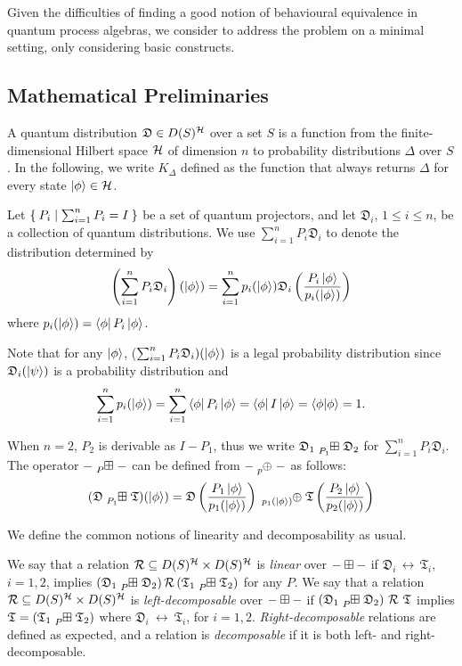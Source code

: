 \newcommand{\quantumdst}{\mathfrak{D}}
\newcommand{\quantumdsta}{\mathfrak{T}}

Given the difficulties of finding a good notion of behavioural equivalence in quantum process algebras, we consider to address the problem on a minimal setting, only considering basic constructs.

\subsection{Mathematical Preliminaries}

A quantum distribution $\quantumdst \in D(S)^\hilbert$ over a set $S$ is a function from the finite-dimensional Hilbert space $\mathcal{H}$ of dimension $n$ to probability distributions $\Delta$ over $S$.
In the following, we write $K_{\Delta}$ defined as the function that always returns $\Delta$ for every state $\ket{\phi} \in \mathcal{H}$.

Let $\Set{P_i | \sum_{i = 1}^{n} P_i = I }$ be a set of quantum projectors, and let $\quantumdst_i$, $1 \leq i \leq n$, be a collection of quantum distributions.
We use $\sum_{i = 1}^{n} P_i \quantumdst_i$ to denote the distribution determined by 
\[
\left(\sum_{i = 1}^{n} P_i \quantumdst_i\right) (\ket{\phi}) = \sum_{i = 1}^{n} p_i(\ket{\phi}) \quantumdst_i \left(\frac{P_i \ket{\phi}}{p_i(\ket{\phi})}\right)
\]
where $p_i(\ket{\phi}) = \bra{\phi} P_i \ket{\phi}$.

Note that for any $\ket{\phi}$, ($\sum_{i = 1}^{n} P_i \quantumdst_i) (\ket{\phi})$ is a legal probability distribution since $\quantumdst_i(\ket{\psi})$ is a probability distribution and
\[
\sum_{i = 1}^{n} p_i (\ket{\phi}) = \sum_{i = 1}^{n} \bra{\phi} P_i \ket{\phi} = \bra{\phi} I \ket{\phi} = \braket{\phi | \phi} = 1.
\]

When $n = 2$, $P_2$ is derivable as $I - P_1$, thus we write $\quantumdst_1 \qsum{P_1} \quantumdst_2$ for $\sum_{i = 1}^{n} P_i \quantumdst_i$.
The operator $\blank \qsum{P} \blank$ can be defined from $\blank \tensor[_p]{\oplus}{} \blank$ as follows:
\[
  (\quantumdst \qsum{P_1} \quantumdsta) (\ket{\phi}) = \quantumdst \left(\frac{P_1 \ket{\phi}}{p_1(\ket{\phi})}\right) \tensor[_{p_1(\ket{\phi})}]{\oplus}{} \quantumdsta \left(\frac{P_2 \ket{\phi}}{p_2(\ket{\phi})}\right)
\]

We define the common notions of linearity and decomposability as usual.
\begin{definition}
We say that a relation $\mathcal{R} \subseteq D(S)^{\mathcal{H}} \times D(S)^{\mathcal{H}}$ is \emph{linear} over ${-} \boxplus {-}$ if $\quantumdst_i\,\rel\,\quantumdsta_i$, $i = 1,2$, implies $(\quantumdst_1 \qsum{P} \quantumdst_2)\,\rel\,(\quantumdsta_1 \qsum{P} \quantumdsta_2)$ for any $P$.
We say that a relation $\mathcal{R} \subseteq D(S)^{\mathcal{H}} \times D(S)^{\mathcal{H}}$ is \emph{left-decomposable} over ${-} \boxplus {-}$ if $(\quantumdst_1 \qsum{P} \quantumdst_2)\ \rel\ \quantumdsta$ implies $\quantumdsta = (\quantumdsta_1 \qsum{P} \quantumdsta_2)$ where $\quantumdst_i\ \rel\ \quantumdsta_i$, for $i = 1, 2$.
\emph{Right-decomposable} relations are defined as expected, and a relation is \emph{decomposable} if it is both left- and right-decomposable. 
\end{definition}

